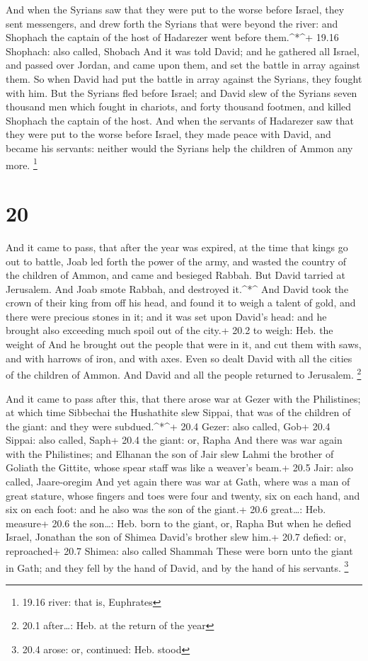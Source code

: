  And when the Syrians saw that they were put to the worse
before Israel, they sent messengers, and drew forth the Syrians that
were beyond the river: and Shophach the captain of the host of Hadarezer
went before them.\^{}*\^{}+ 19.16 Shophach: also called, Shobach
 And it was told David; and he gathered all Israel, and
passed over Jordan, and came upon them, and set the battle in array
against them. So when David had put the battle in array against the
Syrians, they fought with him.  But the Syrians fled before
Israel; and David slew of the Syrians seven thousand men which fought in
chariots, and forty thousand footmen, and killed Shophach the captain of
the host.  And when the servants of Hadarezer saw that they
were put to the worse before Israel, they made peace with David, and
became his servants: neither would the Syrians help the children of
Ammon any more. \footnote{19.16 river: that is, Euphrates}

\hypertarget{section-19}{%
\section{20}\label{section-19}}

 And it came to pass, that after the year was expired, at
the time that kings go out to battle, Joab led forth the power of the
army, and wasted the country of the children of Ammon, and came and
besieged Rabbah. But David tarried at Jerusalem. And Joab smote Rabbah,
and destroyed it.\^{}*\^{}  And David took the crown of
their king from off his head, and found it to weigh a talent of gold,
and there were precious stones in it; and it was set upon David's head:
and he brought also exceeding much spoil out of the city.+ 20.2 to
weigh: Heb. the weight of  And he brought out the people
that were in it, and cut them with saws, and with harrows of iron, and
with axes. Even so dealt David with all the cities of the children of
Ammon. And David and all the people returned to Jerusalem. \footnote{20.1
  after\ldots: Heb. at the return of the year}

 And it came to pass after this, that there arose war at
Gezer with the Philistines; at which time Sibbechai the Hushathite slew
Sippai, that was of the children of the giant: and they were
subdued.\^{}*\^{}+ 20.4 Gezer: also called, Gob+ 20.4 Sippai: also
called, Saph+ 20.4 the giant: or, Rapha  And there was war
again with the Philistines; and Elhanan the son of Jair slew Lahmi the
brother of Goliath the Gittite, whose spear staff was like a weaver's
beam.+ 20.5 Jair: also called, Jaare-oregim  And yet again
there was war at Gath, where was a man of great stature, whose fingers
and toes were four and twenty, six on each hand, and six on each foot:
and he also was the son of the giant.+ 20.6 great\ldots: Heb. measure+
20.6 the son\ldots: Heb. born to the giant, or, Rapha  But
when he defied Israel, Jonathan the son of Shimea David's brother slew
him.+ 20.7 defied: or, reproached+ 20.7 Shimea: also called Shammah
 These were born unto the giant in Gath; and they fell by
the hand of David, and by the hand of his servants. \footnote{20.4
  arose: or, continued: Heb. stood}


